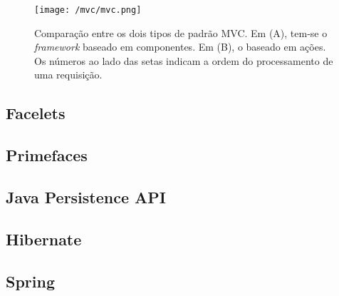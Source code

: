 \documentclass[
  10.5pt,				  %
	openright,			%
	twoside,			  %
  a5paper,
  chapter=TITLE,	%
	section=TITLE,	%
  hyphens,        %
	english,        %
	brazil          %
]{abntex2}
\begin{document}
\begin{figure}[!ht]
  \caption{\label{fig:mvc}Comparação entre os dois tipos de padrão MVC. Em (A), tem-se o \emph{framework} baseado em componentes. Em (B), o baseado em ações. Os números ao lado das setas indicam a ordem do processamento de uma requisição.}
  \begin{center}
    \texttt{[image: /mvc/mvc.png]}
  \end{center}
\end{figure}


%
%


\subsection{Facelets}\label{sec:facelets}

\subsection{Primefaces}

\subsection{Java Persistence API}

\subsection{Hibernate}

\subsection{Spring}
\end{document}
